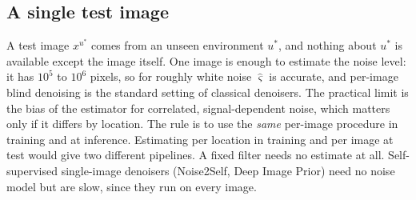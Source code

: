 \subsection{A single test image}
\label{app:noise:single}
A test image $x^{u^*}$ comes from an unseen environment $u^*$, and nothing about $u^*$ is available
except the image itself. One image is enough to estimate the noise level: it has $10^5$ to $10^6$
pixels, so for roughly white
noise $\hat\varsigma$ is accurate, and per-image blind denoising is the standard setting of classical
denoisers. The practical limit is the bias of the estimator for correlated, signal-dependent noise, which
matters only if it differs by location. The rule is to use the \emph{same} per-image procedure in
training and at inference. Estimating per location in training and per image at test would give two
different pipelines. A fixed filter needs no estimate at all. Self-supervised single-image denoisers
(Noise2Self, Deep Image Prior) need no noise model but are slow, since they run on every image.

